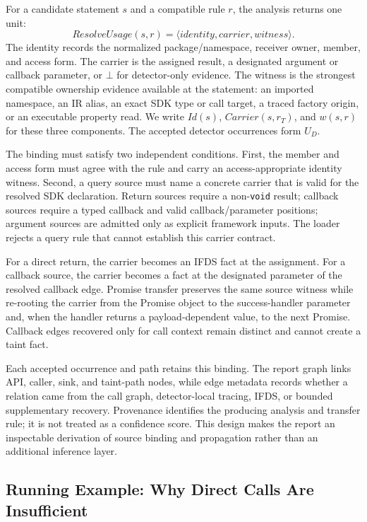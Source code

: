 For a candidate statement $s$ and a compatible rule $r$, the analysis returns one unit:
\begin{equation}
\mathit{ResolveUsage}(s,r)=\langle identity,carrier,witness\rangle.
\end{equation}
The identity records the normalized package/namespace, receiver owner, member, and access form. The carrier is the assigned result, a designated argument or callback parameter, or $\bot$ for detector-only evidence. The witness is the strongest compatible ownership evidence available at the statement: an imported namespace, an IR alias, an exact SDK type or call target, a traced factory origin, or an executable property read. We write $\mathit{Id}(s)$, $\mathit{Carrier}(s,r_T)$, and $w(s,r)$ for these three components. The accepted detector occurrences form $U_D$.

The binding must satisfy two independent conditions. First, the member and access form must agree with the rule and carry an access-appropriate identity witness. Second, a query source must name a concrete carrier that is valid for the resolved SDK declaration. Return sources require a non-\texttt{void} result; callback sources require a typed callback and valid callback/parameter positions; argument sources are admitted only as explicit framework inputs. The loader rejects a query rule that cannot establish this carrier contract.

For a direct return, the carrier becomes an IFDS fact at the assignment. For a callback source, the carrier becomes a fact at the designated parameter of the resolved callback edge. Promise transfer preserves the same source witness while re-rooting the carrier from the Promise object to the success-handler parameter and, when the handler returns a payload-dependent value, to the next Promise. Callback edges recovered only for call context remain distinct and cannot create a taint fact.

Each accepted occurrence and path retains this binding. The report graph links API, caller, sink, and taint-path nodes, while edge metadata records whether a relation came from the call graph, detector-local tracing, IFDS, or bounded supplementary recovery. Provenance identifies the producing analysis and transfer rule; it is not treated as a confidence score. This design makes the report an inspectable derivation of source binding and propagation rather than an additional inference layer.

\subsection{Running Example: Why Direct Calls Are Insufficient}
\label{subsec:running_example}

